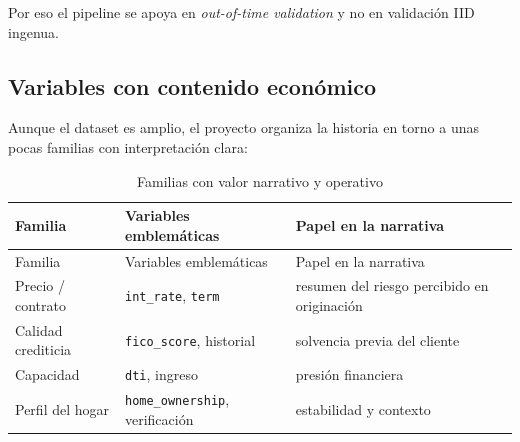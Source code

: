 \documentclass[
  spanish,
  11pt,
  letterpaper,
]{scrbook}
\theoremstyle{plain}
\theoremstyle{remark}
\begin{document}
Por eso el pipeline se apoya en \emph{out-of-time validation} y no en
validación IID ingenua.

\subsection{Variables con contenido
económico}\label{variables-con-contenido-econuxf3mico}

Aunque el dataset es amplio, el proyecto organiza la historia en torno a
unas pocas familias con interpretación clara:

\begin{longtable}[]{@{}
  >{\raggedright\arraybackslash}p{}
  >{\raggedright\arraybackslash}p{}
  >{\raggedright\arraybackslash}p{}@{}}
\caption{Familias con valor narrativo y
operativo}\label{tbl-eda-families}\tabularnewline
\toprule\noalign{}
\begin{minipage}[b]{\linewidth}\raggedright
Familia
\end{minipage} & \begin{minipage}[b]{\linewidth}\raggedright
Variables emblemáticas
\end{minipage} & \begin{minipage}[b]{\linewidth}\raggedright
Papel en la narrativa
\end{minipage} \\
\midrule\noalign{}
\endfirsthead
\toprule\noalign{}
\begin{minipage}[b]{\linewidth}\raggedright
Familia
\end{minipage} & \begin{minipage}[b]{\linewidth}\raggedright
Variables emblemáticas
\end{minipage} & \begin{minipage}[b]{\linewidth}\raggedright
Papel en la narrativa
\end{minipage} \\
\midrule\noalign{}
\endhead
\bottomrule\noalign{}
\endlastfoot
Precio / contrato & \texttt{int\_rate}, \texttt{term} & resumen del
riesgo percibido en originación \\
Calidad crediticia & \texttt{fico\_score}, historial & solvencia previa
del cliente \\
Capacidad & \texttt{dti}, ingreso & presión financiera \\
Perfil del hogar & \texttt{home\_ownership}, verificación & estabilidad
y contexto \\
\end{longtable}
\end{document}
